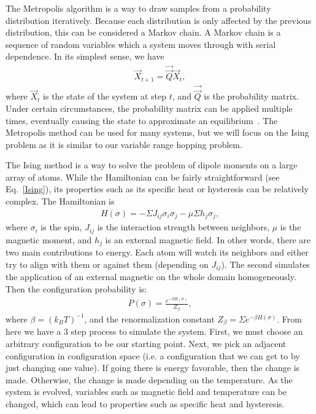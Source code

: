 The Metropolis algorithm is a way to draw samples from a probability distribution iteratively. Because each distribution is only affected by the previous distribution, this can be considered a Markov chain. A Markov chain is a sequence of random variables which a system moves through with serial dependence. In its simplest sense, we have
\begin{eqnarray}
\overrightarrow X_{t+1} = \overrightarrow{ \overrightarrow Q} \overrightarrow X_{t} ,
\label{Markov}
\end{eqnarray}
where $\overrightarrow X_t$ is the state of the system at step $t$, and $\overrightarrow{\overrightarrow Q}$ is the probability matrix. Under certain circumstances, the probability matrix can be applied multiple times, eventually causing the state to approximate an equilibrium~\cite{Everitt02}. The Metropolis method can be used for many systems, but we will focus on the Ising problem as it is similar to our variable range hopping problem. 

The Ising method is a way to solve the problem of dipole moments on a large array of atoms. While the Hamiltonian can be fairly straightforward (see Eq.~\ref{Ising}), its properties such as its specific heat or hysteresis can be relatively complex.
The Hamiltonian is
\begin{eqnarray}
H(\sigma) = - \Sigma J_{ij} \sigma_i \sigma_j - \mu \Sigma h_j \sigma_j , 
\label{Ising}
\end{eqnarray}
where $\sigma_i$ is the spin, $J_{ij}$ is the interaction strength between neighbors, $\mu$ is the magnetic moment, and $h_j$ is an external magnetic field. In other words, there are two main contributions to energy. Each atom will watch its neighbors and either try to align with them or against them (depending on $J_{ij}$). The second simulates the application of an external magnetic on the whole domain homogeneously.  Then the configuration probability is:
\begin{eqnarray}
P(\sigma) = \frac {e^{-\beta H(\sigma) }} {Z_\beta },
\label{configurationProbability}
\end{eqnarray}
where $\beta = (k_B T)^{-1}$, and the renormalization constant $Z_\beta = \Sigma e^{-\beta H(\sigma)}$. From here we have a 3 step process to simulate the system. First, we must choose an arbitrary configuration to be our starting point. Next, we pick an adjacent configuration in configuration space (i.e. a configuration that we can get to by just changing one value). If going there is energy favorable, then the change is made. Otherwise, the change is made depending on the temperature. As the system is evolved, variables such as magnetic field and temperature can be changed, which can lead to properties such as specific heat and hysteresis. 


